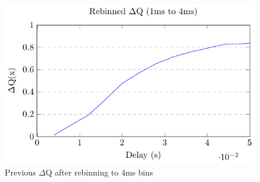         \begin{figure}[H]%
            \begin{center}
                \includegraphics[scale=1.2]{tikz/rebinned_cdf.pdf}
            \end{center}
            \caption{Previous $\Delta$Q after rebinning to 4ms bins}
        \end{figure}%
